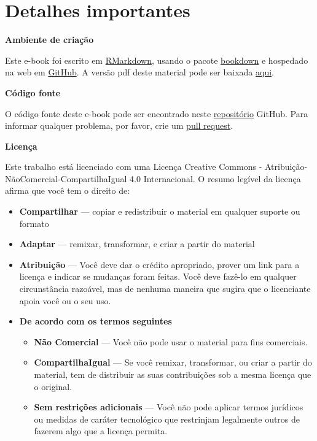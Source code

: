 \documentclass[
]{book}
\numberwithin{equation}{section}
\begin{document}
\hypertarget{detalhes-importantes}{%
\chapter*{Detalhes importantes}\label{detalhes-importantes}}

\textbf{Ambiente de criação}

Este e-book foi escrito em \href{https://rmarkdown.rstudio.com/}{RMarkdown}, usando o pacote \href{https://bookdown.org/yihui/bookdown/}{bookdown} e hospedado na web em \href{https://tiagoolivoto.github.io/e-bookr/}{GitHub}. A versão pdf deste material pode ser baixada \href{https://github.com/TiagoOlivoto/e-bookr/raw/master/data/pdf_r.pdf}{aqui}.

\textbf{Código fonte}

O código fonte deste e-book pode ser encontrado neste \href{https://github.com/TiagoOlivoto/e-bookr}{repositório} GitHub. Para informar qualquer problema, por favor, crie um \href{https://github.com/TiagoOlivoto/e-bookr/pulls}{pull request}.

\textbf{Licença}

Este trabalho está licenciado com uma Licença Creative Commons - Atribuição-NãoComercial-CompartilhaIgual 4.0 Internacional. O resumo legível da licença afirma que você tem o direito de:

\begin{itemize}
\item
  \textbf{Compartilhar} --- copiar e redistribuir o material em qualquer suporte ou formato
\item
  \textbf{Adaptar} --- remixar, transformar, e criar a partir do material
\item
  \textbf{Atribuição} --- Você deve dar o crédito apropriado, prover um link para a licença e indicar se mudanças foram feitas. Você deve fazê-lo em qualquer circunstância razoável, mas de nenhuma maneira que sugira que o licenciante apoia você ou o seu uso.
\item
  \textbf{De acordo com os termos seguintes}

  \begin{itemize}
  \item
    \textbf{Não Comercial} --- Você não pode usar o material para fins comerciais.
  \item
    \textbf{CompartilhaIgual} --- Se você remixar, transformar, ou criar a partir do material, tem de distribuir as suas contribuições sob a mesma licença que o original.
  \item
    \textbf{Sem restrições adicionais} --- Você não pode aplicar termos jurídicos ou medidas de caráter tecnológico que restrinjam legalmente outros de fazerem algo que a licença permita.
  \end{itemize}
\end{itemize}
\end{document}

